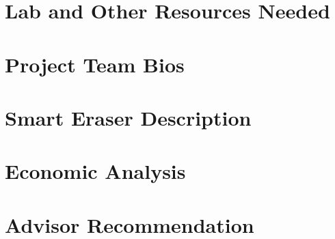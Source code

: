 \documentclass{IEEEtran}					%
\begin{document}
	\section{Lab and Other Resources Needed}
	\setlength{\parindent}{5ex}	
	
	\section{Project Team Bios}
	\setlength{\parindent}{5ex}
	
	\section{Smart Eraser Description}
	\setlength{\parindent}{5ex}
	
	\section{Economic Analysis}
	\setlength{\parindent}{5ex}
	
	\section{Advisor Recommendation}
	\setlength{\parindent}{5ex}
\end{document}
